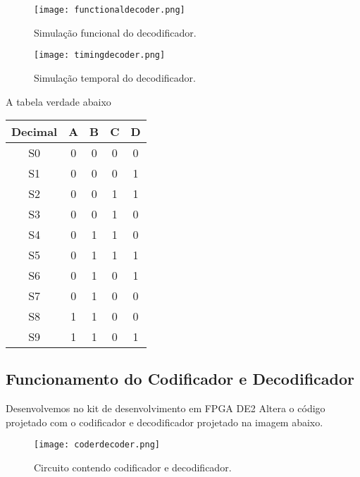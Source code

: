 \documentclass[12pt]{article}
\begin{document}
\begin{figure}[H]
	\centering
	\texttt{[image: functionaldecoder.png]}
	\caption{Simulação funcional do decodificador.}
	\label{fig:funcdecoder}
\end{figure}

\begin{figure}[H]
	\centering
	\texttt{[image: timingdecoder.png]}
	\caption{Simulação temporal do decodificador.}
	\label{fig:timedecoder}
\end{figure}

A tabela verdade abaixo 

\begin{table}[H]
	\centering
	\begin{tabular}{|c|c|c|c|c|}
		\cline{1-5}
		\multicolumn{1}{|c|}{Decimal} & \multicolumn{1}{|c|}{A} & \multicolumn{1}{|c|}{B} & \multicolumn{1}{|c|}{C} & \multicolumn{1}{|c|}{D}\\
		\hline
		S0 & 0 & 0 & 0 & 0 \\
		\hline
		S1 & 0 & 0 & 0 & 1 \\
		\hline
		S2 & 0 & 0 & 1 & 1 \\
		\hline
		S3 & 0 & 0 & 1 & 0 \\
		\hline
		S4 & 0 & 1 & 1 & 0 \\
		\hline
		S5 & 0 & 1 & 1 & 1 \\
		\hline
		S6 & 0 & 1 & 0 & 1 \\
		\hline
		S7 & 0 & 1 & 0 & 0 \\
		\hline
		S8 & 1 & 1 & 0 & 0 \\
		\hline
		S9 & 1 & 1 & 0 & 1 \\
		\hline
	\end{tabular}
	
\end{table} 




\subsection{Funcionamento do Codificador e Decodificador}

Desenvolvemos no kit de desenvolvimento em FPGA DE2 Altera o código projetado com o codificador e decodificador projetado na imagem abaixo. 

\begin{figure}[H]
	\centering
	\texttt{[image: coderdecoder.png]}
	\caption{Circuito contendo codificador e decodificador.}
	\label{fig:coderdecoder}
\end{figure}
\end{document}
